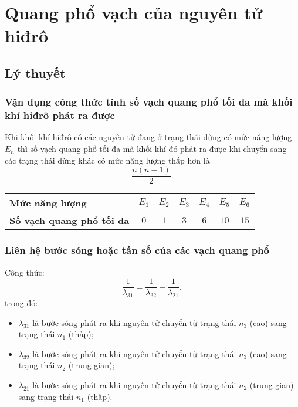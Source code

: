 
\chapter[Quang phổ vạch của nguyên tử hiđrô]{Quang phổ vạch của nguyên tử hiđrô}

\section{Lý thuyết}

\subsection{Vận dụng công thức tính số vạch quang phổ tối đa mà khối khí hiđrô phát ra được}

Khi khối khí hiđrô có các nguyên tử đang ở trạng thái dừng có mức năng lượng $E_n$ thì số vạch quang phổ tối đa mà khối khí đó phát ra được khi chuyển sang các trạng thái dừng khác có mức năng lượng thấp hơn là
\begin{equation}
	\dfrac{n(n-1)}{2}.
\end{equation}

\begin{center}
	\begin{tabular}{|m{15em}|c|c|c|c|c|c|}
		\hline
		\textbf{Mức năng lượng} 
		&$E_1$
		&$E_2$
		&$E_3$
		&$E_4$
		&$E_5$
		&$E_6$
		\\ \hline
		\textbf{Số vạch quang phổ tối đa}
		& $0$ 
		& $1$ 
		& $3$ 
		& $6$ 
		& $10$ 
		& $15$ 
		\\ \hline
	\end{tabular}
\end{center}

\subsection{Liên hệ bước sóng hoặc tần số của các vạch quang phổ}

Công thức:
\begin{equation}
	\dfrac{1}{\lambda_{31}} = \dfrac{1}{\lambda_{32}}+ \dfrac{1}{\lambda_{21}},
\end{equation}
trong đó:
\begin{itemize}
	\item $\lambda_{31}$ là bước sóng phát ra khi nguyên tử chuyển từ trạng thái $n_3$ (cao) sang trạng thái $n _1$ (thấp);
	\item $\lambda_{32}$ là bước sóng phát ra khi nguyên tử chuyển từ trạng thái $n_3$ (cao) sang trạng thái $n _2$ (trung gian);
	\item $\lambda_{21}$ là bước sóng phát ra khi nguyên tử chuyển từ trạng thái $n_2$ (trung gian) sang trạng thái $n _1$ (thấp).
\end{itemize}
